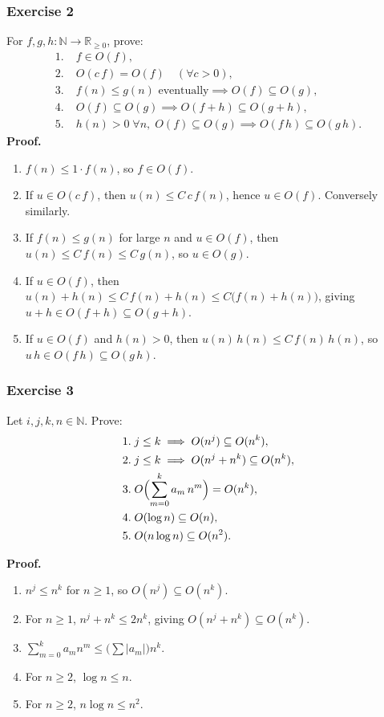 \documentclass{article}
\theoremstyle{theorem}
\theoremstyle{definition}
\theoremstyle{remark}
\begin{document}
\subsubsection*{Exercise 2}
For \(f,g,h\colon\mathbb N\to\mathbb R_{\ge0}\), prove:
\[
\begin{aligned}
1.\;&f\in O(f),\\
2.\;&O(c\,f)=O(f)\quad(\forall c>0),\\
3.\;&f(n)\le g(n)\text{ eventually}\implies O(f)\subseteq O(g),\\
4.\;&O(f)\subseteq O(g)\implies O(f+h)\subseteq O(g+h),\\
5.\;&h(n)>0\;\forall n,\;O(f)\subseteq O(g)\implies O(f\,h)\subseteq O(g\,h).
\end{aligned}
\]
\textbf{Proof.}
\begin{enumerate}[label=\arabic*.]
  \item \(f(n)\le1\cdot f(n)\), so \(f\in O(f)\).
  \item If \(u\in O(c\,f)\), then \(u(n)\le C\,c\,f(n)\), hence \(u\in O(f)\).  Conversely similarly.
  \item If \(f(n)\le g(n)\) for large \(n\) and \(u\in O(f)\), then \(u(n)\le C\,f(n)\le C\,g(n)\), so \(u\in O(g)\).
  \item If \(u\in O(f)\), then \(u(n)+h(n)\le C\,f(n)+h(n)\le C\bigl(f(n)+h(n)\bigr)\), giving \(u+h\in O(f+h)\subseteq O(g+h)\).
  \item If \(u\in O(f)\) and \(h(n)>0\), then \(u(n)\,h(n)\le C\,f(n)\,h(n)\), so \(u\,h\in O(f\,h)\subseteq O(g\,h)\).
\end{enumerate}

\subsubsection*{Exercise 3}
Let \(i,j,k,n\in\mathbb N\). Prove:
\[
\begin{aligned}
1.\;&j\le k\implies O(n^j)\subseteq O(n^k),\\
2.\;&j\le k\implies O(n^j+n^k)\subseteq O(n^k),\\
3.\;&O\Bigl(\sum_{m=0}^k a_m\,n^m\Bigr)=O(n^k),\\
4.\;&O(\log n)\subseteq O(n),\\
5.\;&O(n\log n)\subseteq O(n^2).
\end{aligned}
\]

\newpage

\textbf{Proof.}
\begin{enumerate}[label=\arabic*.]
  \item \(n^j\le n^k\) for \(n\ge1\), so \(O(n^j)\subseteq O(n^k)\).
  \item For \(n\ge1\), \(n^j+n^k\le2n^k\), giving \(O(n^j+n^k)\subseteq O(n^k)\).
  \item \(\sum_{m=0}^k a_m n^m\le \bigl(\sum|a_m|\bigr)n^k\).
  \item For \(n\ge2\), \(\log n\le n\).
  \item For \(n\ge2\), \(n\log n\le n^2\).
\end{enumerate}
\end{document}
